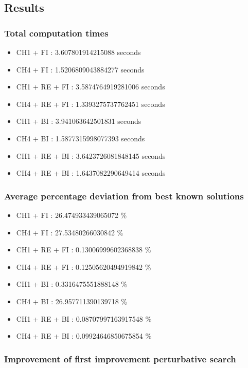 \documentclass[a4paper,12pt]{article}
\begin{document}
\subsection{Results}

\subsubsection{Total computation times}

\begin{itemize}
    \item CH1 + FI : 3.607801914215088 seconds
    \item CH4 + FI : 1.5206809043884277 seconds
    \item CH1 + RE + FI : 3.5874764919281006 seconds
    \item CH4 + RE + FI : 1.3393275737762451 seconds
    \item CH1 + BI : 3.941063642501831 seconds
    \item CH4 + BI : 1.5877315998077393 seconds
    \item CH1 + RE + BI : 3.6423726081848145 seconds
    \item CH4 + RE + BI : 1.6437082290649414 seconds
\end{itemize}

\subsubsection{Average percentage deviation from best known solutions}

\begin{itemize}
    \item CH1 + FI : 26.474933439065072 \%
    \item CH4 + FI : 27.53480266030842 \%
    \item CH1 + RE + FI : 0.13006999602368838 \%
    \item CH4 + RE + FI : 0.12505620494919842 \%
    \item CH1 + BI : 0.3316475551888148 \%
    \item CH4 + BI : 26.957711390139718 \%
    \item CH1 + RE + BI : 0.08707997163917548 \%
    \item CH4 + RE + BI : 0.09924646850675854 \%
\end{itemize}

\subsubsection{Improvement of first improvement perturbative search}
\end{document}
